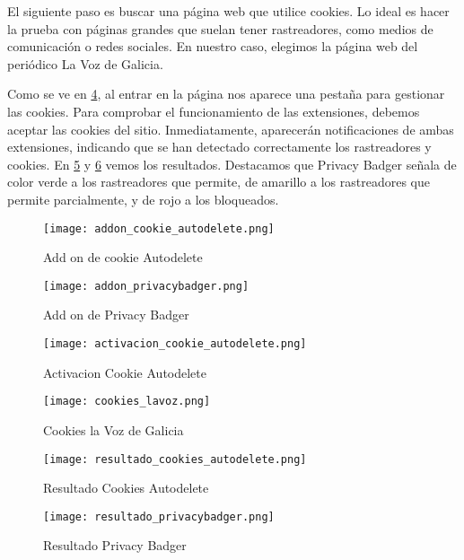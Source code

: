 El siguiente paso es buscar una página web que utilice cookies. Lo ideal es hacer la prueba con páginas grandes que suelan tener rastreadores, como medios de comunicación o redes sociales. En nuestro caso, elegimos la página web del periódico La Voz de Galicia.  

Como se ve en \ref{fig:cookies_lavoz}, al entrar en la página nos aparece una pestaña para gestionar las cookies. Para comprobar el funcionamiento de las extensiones, debemos aceptar las cookies del sitio. Inmediatamente, aparecerán notificaciones de ambas extensiones, indicando que se han detectado correctamente los rastreadores y cookies. En \ref{fig:resultado_cookies_autodelete} y \ref{fig:resultado_privacybadger} vemos los resultados. Destacamos que Privacy Badger señala de color verde a los rastreadores que permite, de amarillo a los rastreadores que permite parcialmente, y de rojo a los bloqueados. 

\begin{figure}[H]   
    \texttt{[image: addon\_cookie\_autodelete.png]}
    \caption{Add on de cookie Autodelete}
    \label{fig:addon_cookie_autodelete}
\end{figure}

\begin{figure}[H]   
    \texttt{[image: addon\_privacybadger.png]}
    \caption{Add on de Privacy Badger}
    \label{fig:addon_privacybadger}
\end{figure}

\begin{figure}[H]   
    \texttt{[image: activacion\_cookie\_autodelete.png]}
    \caption{Activacion Cookie Autodelete}
    \label{fig:activacion_cookie_autodelete}
\end{figure}

\begin{figure}[H]   
    \texttt{[image: cookies\_lavoz.png]}
    \caption{Cookies la Voz de Galicia}
    \label{fig:cookies_lavoz}
\end{figure}

\begin{figure}[H]   
    \texttt{[image: resultado\_cookies\_autodelete.png]}
    \caption{Resultado Cookies Autodelete}
    \label{fig:resultado_cookies_autodelete}
\end{figure}

\begin{figure}[H]   
    \texttt{[image: resultado\_privacybadger.png]}
    \caption{Resultado Privacy Badger}
    \label{fig:resultado_privacybadger}
\end{figure}